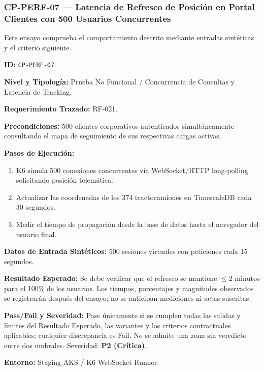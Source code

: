 \subsubsection*{CP-PERF-07 — Latencia de Refresco de Posición en Portal Clientes con 500 Usuarios Concurrentes}\label{sec:9-cp-perf-07}
Este ensayo comprueba el comportamiento descrito mediante entradas sintéticas y el criterio siguiente.

\par\noindent\textbf{ID:} \texttt{C\allowbreak{}P\allowbreak{}-\allowbreak{}P\allowbreak{}E\allowbreak{}R\allowbreak{}F\allowbreak{}-\allowbreak{}0\allowbreak{}7\allowbreak{}}\par
\par\noindent\textbf{Nivel y Tipología:} Prueba No Funcional / Concurrencia de Consultas y Latencia de Tracking.\par
\par\noindent\textbf{Requerimiento Trazado:} RF-021.\par
\par\noindent\textbf{Precondiciones:} 500 clientes corporativos autenticados simultáneamente consultando el mapa de seguimiento de sus respectivas cargas activas.\par
\par\noindent\textbf{Pasos de Ejecución:} \par
\begin{enumerate}
\item K6 simula 500 conexiones concurrentes vía WebSocket/HTTP long-polling solicitando posición telemática.
\item Actualizar las coordenadas de los 374 tractocamiones en TimescaleDB cada 30 segundos.
\item Medir el tiempo de propagación desde la base de datos hasta el navegador del usuario final.
\end{enumerate}
\par\noindent\textbf{Datos de Entrada Sintéticos:} 500 sesiones virtuales con peticiones cada 15 segundos.\par
\par\noindent\textbf{Resultado Esperado:} Se debe verificar que el refresco se mantiene \(\le 2\text{ minutos}\) para el 100\% de los usuarios. Los tiempos, porcentajes y magnitudes observados se registrarán después del ensayo; no se anticipan mediciones ni actas suscritas.\par
\par\noindent\textbf{Pass/Fail y Severidad:} Pass únicamente si se cumplen todas las salidas y límites del Resultado Esperado, las variantes y los criterios contractuales aplicables; cualquier discrepancia es Fail. No se admite una zona sin veredicto entre dos umbrales. Severidad: \textbf{P2 (Crítica)}.\par
\par\noindent\textbf{Entorno:} Staging AKS / K6 WebSocket Runner.\par






